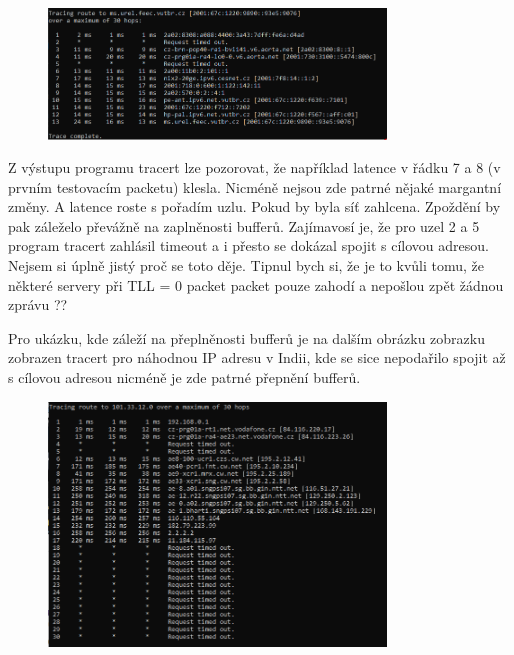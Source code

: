 \documentclass[10pt, a4paper]{article}%
\begin{document}
\begin{enumerate}
		\begin{figure}[ht!]
			\centering
			\includegraphics[width = 0.8\textwidth]{tracert.PNG}
		\end{figure}

		Z výstupu programu tracert lze pozorovat, že například latence v řádku 7 a 8 (v prvním testovacím packetu)
		klesla. Nicméně nejsou zde patrné nějaké margantní změny. A latence roste s pořadím uzlu. Pokud by byla
		síť zahlcena. Zpoždění by pak záleželo převážně na zaplněnosti bufferů.
		Zajímavosí je, že pro uzel 2 a 5 program tracert zahlásil timeout a i přesto se dokázal spojit s cílovou adresou.
		Nejsem si úplně jistý proč se toto děje. Tipnul bych si, že je to kvůli tomu, že některé servery při 
		TLL = 0 packet packet pouze zahodí a nepošlou zpět žádnou zprávu ??

		Pro ukázku, kde záleží na přeplněnosti bufferů je na dalším obrázku zobrazku zobrazen tracert pro náhodnou IP adresu
		v Indii, kde se sice nepodařilo spojit až s cílovou adresou nicméně je zde patrné přepnění bufferů.	\\
		\begin{figure}[ht!]
			\centering
			\includegraphics[width = 0.8\textwidth]{tracert_INDIA.PNG}
		\end{figure}


\end{enumerate}
\end{document}
